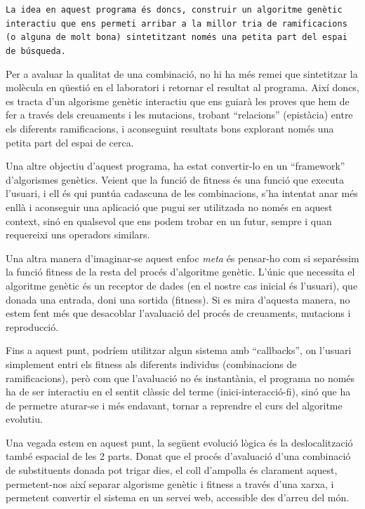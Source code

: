 	\texttt{La idea en aquest programa és doncs, construir un algoritme genètic
	interactiu que ens permeti arribar a la millor tria de ramificacions (o
	alguna de molt bona) sintetitzant només una petita part del espai de búsqueda.}

	Per a avaluar la qualitat de una combinació, no hi ha més remei que
	sintetitzar la molècula en qüestió en el laboratori i retornar el resultat
	al programa.  Així doncs, es tracta d'un algorisme genètic interactiu que
	ens guiarà les proves que hem de fer a través dels creuaments i les
	mutacions, trobant ``relacions'' (epistàcia) entre els diferents
	ramificacions, i aconseguint resultats bons explorant només una petita part
	del espai de cerca.

	Una altre objectiu d'aquest programa, ha estat convertir-lo en un
	``framework'' d'algorismes genètics.  Veient que la funció de fitness és una
	funció que executa l'usuari, i ell és qui puntúa cadascuna de les
	combinacions, s'ha intentat anar més enllà i aconseguir una aplicació que
	pugui ser utilitzada no només en aquest context, sinó en qualsevol que ens
	podem trobar en un futur, sempre i quan requereixi uns operadors similars.

	Una altra manera d'imaginar-se aquest enfoc \emph{meta} és pensar-ho com si
	separéssim la funció fitness de la resta del procés d'algoritme genètic.
	L'únic que necessita el algoritme genètic és un receptor de dades (en el
	nostre cas inicial és l'usuari), que donada una entrada, doni una
	sortida (fitness).  Si es mira d'aquesta manera, no estem fent més que
	desacoblar l'avaluació del procés de creuaments, mutacions i reproducció.

	Fins a aquest punt, podríem utilitzar algun sistema amb ``callbacks'', on
	l'usuari simplement entri els fitness als diferents individus (combinacions
	de ramificacions), però com que l'avaluació no és instantània, el programa no
	només ha de ser interactiu en el sentit clàssic del terme (inici-interacció-fi),
	sinó que ha de permetre aturar-se i més endavant, tornar a reprendre el curs
	del algoritme evolutiu. 

	Una vegada estem en aquest punt, la següent evolució lògica és la
	deslocalització també espacial de les 2 parts.  Donat que el procés
	d'avaluació d'una combinació de substituents donada pot trigar dies, el coll
	d'ampolla és clarament aquest, permetent-nos així separar algorisme
	genètic i fitness a través d'una xarxa, i permetent convertir el sistema en
	un servei web, accessible des d'arreu del món.

